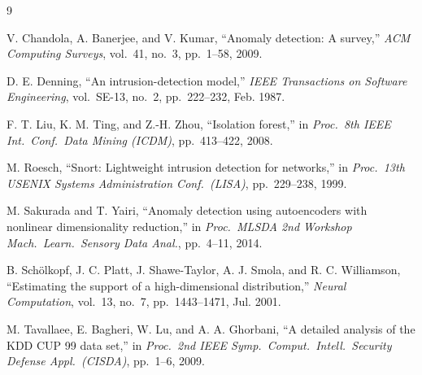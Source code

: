 \documentclass[conference]{IEEEtran}
\begin{document}
\begin{thebibliography}{9}

V. Chandola, A. Banerjee, and V. Kumar,
``Anomaly detection: A survey,''
\textit{ACM Computing Surveys}, vol.~41, no.~3, pp.~1--58, 2009.

D. E. Denning,
``An intrusion-detection model,''
\textit{IEEE Transactions on Software Engineering},
vol.~SE-13, no.~2, pp.~222--232, Feb. 1987.

F. T. Liu, K. M. Ting, and Z.-H. Zhou,
``Isolation forest,''
in \textit{Proc.\ 8th IEEE Int.\ Conf.\ Data Mining (ICDM)},
pp.~413--422, 2008.

M. Roesch,
``Snort: Lightweight intrusion detection for networks,''
in \textit{Proc.\ 13th USENIX Systems Administration Conf.\ (LISA)},
pp.~229--238, 1999.

M. Sakurada and T. Yairi,
``Anomaly detection using autoencoders with nonlinear dimensionality
reduction,''
in \textit{Proc.\ MLSDA 2nd Workshop Mach.\ Learn.\ Sensory Data Anal.},
pp.~4--11, 2014.

B. Sch\"{o}lkopf, J. C. Platt, J. Shawe-Taylor, A. J. Smola, and R. C. Williamson,
``Estimating the support of a high-dimensional distribution,''
\textit{Neural Computation}, vol.~13, no.~7, pp.~1443--1471, Jul. 2001.

M. Tavallaee, E. Bagheri, W. Lu, and A. A. Ghorbani,
``A detailed analysis of the KDD CUP 99 data set,''
in \textit{Proc.\ 2nd IEEE Symp.\ Comput.\ Intell.\ Security Defense Appl.\
(CISDA)}, pp.~1--6, 2009.

\end{thebibliography}
\end{document}
